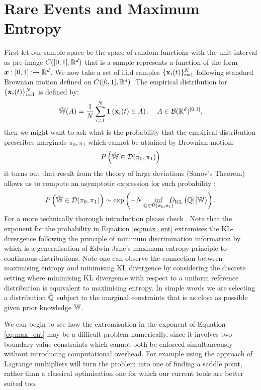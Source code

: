 \documentclass[a4paper,12pt,twoside,openright]{report}
\theoremstyle{definition}
\begin{document}
\section{Rare Events and Maximum Entropy }

First let our sample space be the space of random functions with the unit interval as pre-image $C([0,1], {\mathbb{R}}^d)$ that is a sample  represents a function of the form ${\bm{x}} : [0, 1]:  \rightarrow {\mathbb{R}}^d$.  We now take a set of i.i.d samples $\{{\mathbf{x}}_{i}(t)\}_{i=1}^N$ following standard Brownian motion defined on $C([0,1], {\mathbb{R}}^d)$. The empirical distribution for $\{{\mathbf{x}}_{i}(t)\}_{i=1}^N$ is defined by:
\begin{align}\label{eq:empirical}
    \hat{\mathbb{W}}(A) = \frac{1}{N}\sum_{i=1}^N {\bm{1}}\left({\mathbf{x}}_i(t) \in A\right)  , \quad A \in {\mathcal{B}}({\mathbb{R}}^d)^{[0,1]},
\end{align}
then we might want to ask what is the probability that the empirical distribution prescribes marginals $\pi_0, \pi_1$ which cannot be attained by Brownian motion:
\begin{align}
    {P}\left(\hat{\mathbb{W}} \in \mathcal{D}(\pi_0, \pi_1) \right)
\end{align}
it turns out that result from the theory of large deviations (Sanov's Theorem) allows us to compute an asymptotic expression for such probability \citep{leonard2012schrodinger}:
\begin{align} \label{eq:max_ent}
    {P}\left(\hat{\mathbb{W}} \in \mathcal{D}(\pi_0, \pi_1) \right) \sim \exp\left(-N\inf_{{\mathbb{Q}} \in {\mathcal{D}}(\pi_0, \pi_1)} \!\!\!\!\!D_{\mathrm{KL}}\left({\mathbb{Q}} \big|\big| \mathbb{W}\right)\right).
\end{align}
For a more technically thorough introduction please check \cite{leonard2013survey}. Note that the exponent for the probability in Equation \ref{eq:max_ent} extremises the KL-divergence following the principle of minimum discrimination information by \cite{kullback1997information} which is a generalisation of Edwin Jane's maximum entropy principle \citep{jaynes1957information,jaynes2003probability} to continuous distributions. Note one can observe the connection between maximising entropy and minimising KL divergence by considering the discrete setting where minimising KL divergence with respect to a uniform reference distribution is equivalent to maximising entropy. In simple words we are selecting a distribution $\hat{{\mathbb{Q}}}$ subject to the marginal constraints that is as close as possible given prior knowledge $\mathbb{W}$.

We can begin to see how the extremisation in the exponent of Equation \ref{eq:max_ent} may be a difficult problem numerically, since it involves two boundary value constraints which cannot both be enforced simultaneously without introducing computational overhead. For example using the approach of Lagrange multipliers will turn the problem into one of finding a saddle point, rather than a classical optimisation one for which our current tools are better suited too.
\end{document}
